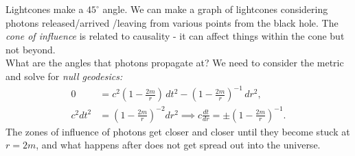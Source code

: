 \documentclass[a4paper, 11pt, normalem]{report}
\begin{document}
Lightcones make a $45^\circ$ angle. 
We can make a graph of lightcones considering photons released/arrived /leaving from various points from the black hole. 
The \emph{cone of influence} is related to causality - it can affect things within the cone but not beyond. \\
What are the angles that photons propagate at?
We need to consider the metric and solve for \emph{null geodesics:}
\begin{align}
    0 &= c^2\left(1-\frac{2m}{r}\right)\,dt^2 - \left(1-\frac{2m}{r}\right)^{-1}\,dr^2, \\
    c^2dt^2 &= \left(1-\frac{2m}{r}\right)^{-2}dr^2 \implies c\frac{dt}{dr} = \pm \left(1-\frac{2m}{r}\right)^{-1}.
\end{align}
The zones of influence of photons get closer and closer until they become stuck at $r=2m$, and what happens after does not get spread out into the universe. 
\end{document}
